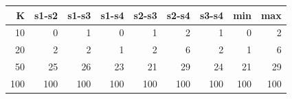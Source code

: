 \begin{tabular}{rrrrrrrrr}
\toprule
K & s1-s2 & s1-s3 & s1-s4 & s2-s3 & s2-s4 & s3-s4 & min & max \\
\midrule
10 & 0 & 1 & 0 & 1 & 2 & 1 & 0 & 2 \\
20 & 2 & 2 & 1 & 2 & 6 & 2 & 1 & 6 \\
50 & 25 & 26 & 23 & 21 & 29 & 24 & 21 & 29 \\
100 & 100 & 100 & 100 & 100 & 100 & 100 & 100 & 100 \\
\bottomrule
\end{tabular}
